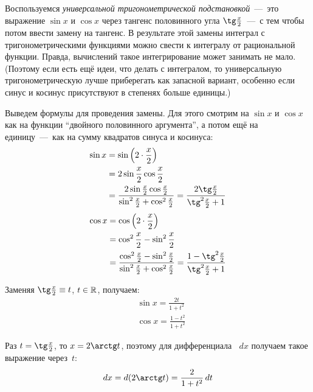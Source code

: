 \documentclass[a4paper,12pt]{article}
\newcommand{\diff}{\mathop{}\!d}
\begin{document}
  \begin{solution}
    Воспользуемся \emph{универсальной тригонометрической подстановкой}~---~это выражение $\sin x$ и $\cos x$ через тангенс половинного угла $\tg \frac{x}{2}$~---~с тем чтобы потом ввести замену на тангенс.
    В результате этой замены интеграл с тригонометрическими функциями можно свести к интегралу от рациональной функции.
    Правда, вычислений такое интегрирование может занимать не мало.
    (Поэтому если есть ещё идеи, что делать с интегралом, то универсальную тригонометрическую лучше приберегать как запасной вариант, особенно если синус и косинус присутствуют в степенях больше единицы.)

    Выведем формулы для проведения замены.
    Для этого смотрим на $\sin x$ и $\cos x$ как на функции ``двойного половинного аргумента'', а потом ещё на единицу~---~как на сумму квадратов синуса и косинуса:
    \begin{equation*}
    \begin{split}
      \sin x &= \sin{\left(2 \cdot \frac{x}{2}\right)}\\
        &= 2 \sin \frac{x}{2} \cos \frac{x}{2}\\
        &= \frac{2 \sin \frac{x}{2} \cos \frac{x}{2}}{\sin^2 \frac{x}{2} + \cos^2 \frac{x}{2}}
        = \frac{2 \tg \frac{x}{2}}{\tg^2 \frac{x}{2} + 1}
    \end{split}
    \end{equation*}
    \begin{equation*}
    \begin{split}
      \cos x &= \cos{\left(2 \cdot \frac{x}{2}\right)}\\
        &= \cos^2 \frac{x}{2} - \sin^2 \frac{x}{2}\\
        &= \frac{\cos^2 \frac{x}{2} - \sin^2 \frac{x}{2}}{\sin^2 \frac{x}{2} + \cos^2 \frac{x}{2}}
        = \frac{1 - \tg^2 \frac{x}{2}}{\tg^2 \frac{x}{2} + 1}
    \end{split}
    \end{equation*}

    Заменяя $\tg \frac{x}{2} \hm\equiv t$, $t \hm\in \RR$, получаем:
    \begin{equation}
      \begin{aligned}
        &\sin x = \frac{2 t}{1 + t^2}\\
        &\cos x = \frac{1 - t^2}{1 + t^2}
      \end{aligned}
    \end{equation}

    Раз $t \hm= \tg \frac{x}{2}$, то $x \hm= 2 \arctg t$, поэтому для дифференциала $\diff x$ получаем такое выражение через~$t$:
    \[
      \diff x = \diff (2 \arctg t) = \frac{2}{1 + t^2} \diff t
    \]


\end{solution}
\end{document}

